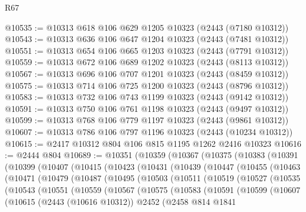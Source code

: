 \begin{lexlean}{R67}
\begin{coremodule}
@10535 := @10313 @618 @106 @629 @1205 @10323 (@2443 (@7180 @10312))
@10543 := @10313 @636 @106 @647 @1204 @10323 (@2443 (@7481 @10312))
@10551 := @10313 @654 @106 @665 @1203 @10323 (@2443 (@7791 @10312))
@10559 := @10313 @672 @106 @689 @1202 @10323 (@2443 (@8113 @10312))
@10567 := @10313 @696 @106 @707 @1201 @10323 (@2443 (@8459 @10312))
@10575 := @10313 @714 @106 @725 @1200 @10323 (@2443 (@8796 @10312))
@10583 := @10313 @732 @106 @743 @1199 @10323 (@2443 (@9142 @10312))
@10591 := @10313 @750 @106 @761 @1198 @10323 (@2443 (@9497 @10312))
@10599 := @10313 @768 @106 @779 @1197 @10323 (@2443 (@9861 @10312))
@10607 := @10313 @786 @106 @797 @1196 @10323 (@2443 (@10234 @10312))
@10615 := @2417 @10312 @804 @106 @815 @1195 @1262 @2416 @10323
@10616 := @2444 @804
@10689 := @10351
    (@10359
      (@10367
        (@10375
          (@10383
            (@10391
              (@10399
                (@10407
                  (@10415
                    (@10423
                      (@10431
                        (@10439
                          (@10447
                            (@10455
                              (@10463
                                (@10471
                                  (@10479
                                    (@10487
                                      (@10495
                                        (@10503
                                          (@10511
                                            (@10519
                                              (@10527
                                                (@10535
                                                  (@10543
                                                    (@10551
                                                      (@10559
                                                        (@10567
                                                          (@10575
                                                            (@10583
                                                              (@10591
                                                                (@10599
                                                                  (@10607
                                                                    (@10615
                                                                      (@2443 (@10616 @10312))
                                                                      @2452
                                                                      (@2458
                                                                        @814
                                                                        @1841

\end{coremodule}
\end{lexlean}
